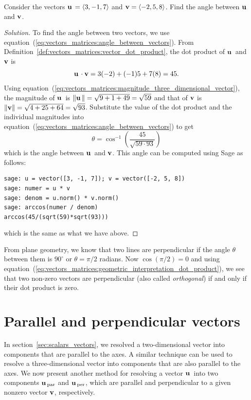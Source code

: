 \begin{example}
Consider the vectors $\operatorname*{\mathbf{u}}{} = \langle 3, -1, 7 \rangle$
and $\operatorname*{\mathbf{v}} = \langle -2, 5, 8 \rangle$. Find the angle
between $\operatorname*{\mathbf{u}}{}$ and $\operatorname*{\mathbf{v}}$.
\end{example}

\begin{proof}[Solution]
To find the angle between two vectors, we use
equation~(\ref{eq:vectors_matrices:angle_between_vectors}). From
Definition~\ref{def:vectors_matrices:vector_dot_product}, the dot
product of $\operatorname*{\mathbf{u}}{}$ and $\operatorname*{\mathbf{v}}$ is
\[
\operatorname*{\mathbf{u}}{} \cdot \operatorname*{\mathbf{v}}
=
3(-2) + (-1)5 + 7(8)
=
45.
\]
Using
equation~(\ref{eq:vectors_matrices:magnitude_three_dimensional_vector}),
the magnitude of $\operatorname*{\mathbf{u}}{}$ is
$\left\Arrowvert \operatorname*{\mathbf{u}}{} \right\Arrowvert = \sqrt{9 + 1 + 49} = \sqrt{59}$ and that
of $\operatorname*{\mathbf{v}}$ is
$\left\Arrowvert \operatorname*{\mathbf{v}} \right\Arrowvert = \sqrt{4 + 25 + 64} = \sqrt{93}$.
Substitute the value of the dot product and the individual magnitudes
into equation~(\ref{eq:vectors_matrices:angle_between_vectors}) to get
\[
\theta
=
\cos^{-1} \left( \frac{45}{\sqrt{59 \cdot 93}} \right)
\]
which is the angle between $\operatorname*{\mathbf{u}}{}$ and $\operatorname*{\mathbf{v}}$. This angle can
be computed using Sage as follows:
%
\begin{lstlisting}
sage: u = vector([3, -1, 7]); v = vector([-2, 5, 8])
sage: numer = u * v
sage: denom = u.norm() * v.norm()
sage: arccos(numer / denom)
arccos(45/(sqrt(59)*sqrt(93)))
\end{lstlisting}
%
which is the same as what we have above.
\end{proof}

From plane geometry, we know that two lines are perpendicular if the
angle $\theta$ between them is $90^{\circ}$ or $\theta = \pi / 2$
radians. Now $\cos (\pi / 2) = 0$ and using
equation~(\ref{eq:vectors_matrices:geometric_interpretation_dot_product}), we see that
two non-zero vectors are perpendicular (also called
\emph{orthogonal}) if and only if their dot
product is zero.



\section{Parallel and perpendicular vectors}

In section~\ref{sec:scalars_vectors}, we resolved a
two-dimensional vector into components that are parallel to the
axes. A similar technique can be used to resolve a three-dimensional
vector into components that are also parallel to the axes. We now
present another method for resolving a vector $\operatorname*{\mathbf{u}}{}$ into two
components $\operatorname*{\mathbf{u}}{}_{\text{par}}$ and $\operatorname*{\mathbf{u}}{}_{\text{per}}$, which are parallel
and perpendicular to a given nonzero vector $\operatorname*{\mathbf{v}}$, respectively.

